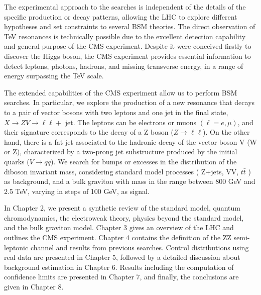 The experimental approach to the searches is independent of the details of the specific production or decay patterns, allowing the LHC to explore different hypotheses and set constraints to several BSM theories. The direct observation of TeV resonances is technically possible due to the excellent detection capability and general purpose of the CMS experiment. Despite it were conceived firstly to discover the Higgs boson, the CMS experiment provides essential information to detect leptons, photons, hadrons, and missing transverse energy, in a range of energy surpassing the TeV scale. 

The extended capabilities of the CMS experiment allow us to perform BSM searches. In particular, we explore the production of a new resonance that decays to a pair of vector bosons with two leptons and one jet in the final state, $X \rightarrow ZV \rightarrow \ell \ell + $ jet. The leptons can be electrons or muons $(\ell = e, \mu)$, and their signature corresponds to the decay of a Z boson ($Z\rightarrow \ell \ell$). On the other hand, there is a fat jet associated to the hadronic decay of the vector boson V (W or Z), characterized by a two-prong jet substructure produced by the initial quarks ($V \rightarrow qq$). We search for bumps or excesses in the distribution of the diboson invariant mass, considering standard model processes ( Z+jets, VV, $t\bar{t}$ ) as background, and a bulk graviton with mass in the range between 800 GeV and 2.5 TeV, varying in steps of 100 GeV, as signal.

In Chapter 2, we present a synthetic review of the standard model, quantum chromodynamics, the electroweak theory, physics beyond the standard model, and the bulk graviton model. Chapter 3 gives an overview of the LHC and outlines the CMS experiment. Chapter 4 contains the definition of the ZZ semi-leptonic channel and results from previous searches. Control distributions using real data are presented in Chapter 5, followed by a detailed discussion about background estimation in Chapter 6. Results including the computation of confidence limits are presented in Chapter 7, and finally, the conclusions are given in Chapter 8.  

